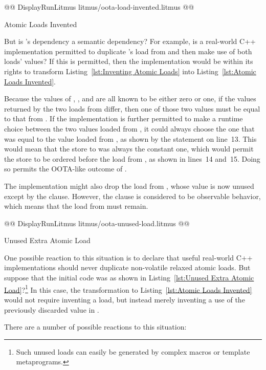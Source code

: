 \documentclass[10]{article}
\begin{document}
\begin{listing}[tbp]
@@ DisplayRunLitmus litmus/oota-load-invented.litmus @@
\caption{Atomic Loads Invented}
\label{lst:Atomic Loads Invented}
\end{listing}

But is 's dependency a semantic dependency?
For example, is a real-world C++ implementation permitted to
duplicate 's load from  and then make use of both loads'
values?
If this is permitted, then the implementation would be within its rights
to transform
Listing~\ref{lst:Inventing Atomic Loads}
into
Listing~\ref{lst:Atomic Loads Invented}.

Because the values of , , and  are all known to be
either zero or one, if the values returned by the two loads from 
differ, then one of those two values must be equal to that from .
If the implementation is further permitted to make a runtime choice
between the two values loaded from , it could always choose the
one that was equal to the value loaded from , as shown by the
 statement on line~13.
This would mean that the store to  was always the constant one,
which would permit the store to be ordered before the load from ,
as shown in lines~14 and~15.
Doing so permits the OOTA-like outcome of .

The implementation might also drop the load from , whose value
is now unused except by the  clause.
However, the  clause is considered to be observable behavior,
which means that the load from  must remain.

\begin{listing}[tbp]
@@ DisplayRunLitmus litmus/oota-unused-load.litmus @@
\caption{Unused Extra Atomic Load}
\label{lst:Unused Extra Atomic Load}
\end{listing}

One possible reaction to this situation is to declare that useful
real-world C++ implementations should never duplicate non-volatile
relaxed atomic loads.
But suppose that the initial code was as shown in
Listing~\ref{lst:Unused Extra Atomic Load}?\footnote{
	Such unused loads can easily be generated by complex macros or
	template metaprograms.}
In this case, the transformation to
Listing~\ref{lst:Atomic Loads Invented}
would not require inventing a load, but instead merely inventing a use of
the previously discarded value in .

There are a number of possible reactions to this situation:
\end{document}

